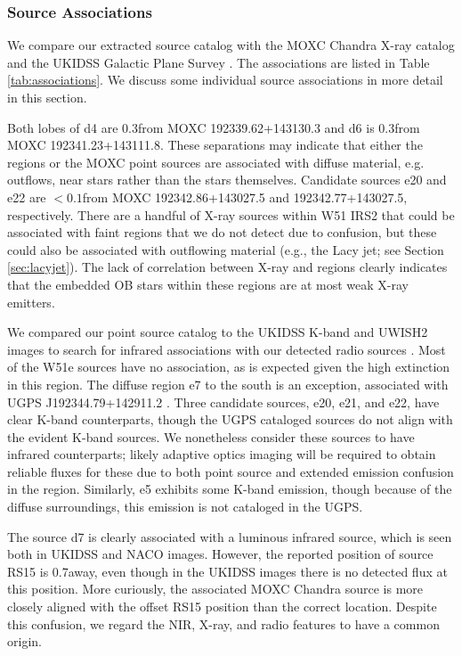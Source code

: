 \subsubsection{Source Associations}
\label{sec:associations}
We compare our extracted source catalog with the MOXC Chandra X-ray catalog
\citep{Townsley2014a} and the UKIDSS Galactic Plane Survey
\citep[UGPS;][]{Lucas2008a}.  The associations are listed in Table
\ref{tab:associations}.  We discuss some
individual source associations in more detail in this section.

Both lobes of d4 are
0.3\arcsec from MOXC 192339.62+143130.3 and d6 is 0.3\arcsec from MOXC
192341.23+143111.8.    These
separations may indicate that either the \hii regions or the MOXC point sources
are associated with diffuse material, e.g. outflows,
near stars rather than the stars themselves.  
Candidate sources e20 and e22 are $<0.1$\arcsec from
MOXC 192342.86+143027.5 and 192342.77+143027.5, respectively.
There are a handful of X-ray
sources within W51 IRS2 that could be associated with faint \hchii regions that
we do not detect due to confusion, but these could also be associated with
outflowing material (e.g., the Lacy jet; see Section \ref{sec:lacyjet}).  The
lack of correlation between X-ray and \hchii regions clearly indicates that the
embedded OB stars within these \hchii regions are at most weak X-ray emitters.  

We compared our point source catalog to the UKIDSS K-band and UWISH2 \hh images
to search for infrared associations with our detected radio sources
\citep{Lucas2008a,Froebrich2011a}.  Most of the W51e sources have no
association, as is expected given the high extinction in this region.  The
diffuse region e7 to the south is an exception, associated with UGPS
J192344.79+142911.2 \citep{Lucas2008a}.  Three candidate sources, e20, e21, and
e22, have clear K-band counterparts, though the UGPS cataloged sources do not
align with the evident K-band sources. We nonetheless consider these sources
to have infrared counterparts; likely adaptive optics imaging will be required
to obtain reliable fluxes for these due to both point source and extended emission
confusion in the region.   Similarly, e5 exhibits some K-band emission, though
because of the diffuse surroundings, this emission is not cataloged in the
UGPS.

The source d7 is clearly associated with a luminous infrared source, which is
seen both in UKIDSS \citep{Lucas2008a} and NACO \citep{Figueredo2008a} images.
However, the reported position of \citet{Goldader1994a} source RS15 is
0.7\arcsec away, even though in the UKIDSS images there is no detected flux at
this position.  More curiously, the associated MOXC Chandra source
\citep{Townsley2014a} is more closely aligned with the offset RS15 position
than the correct location.  Despite this confusion, we regard the NIR, X-ray,
and radio features to have a common origin.


